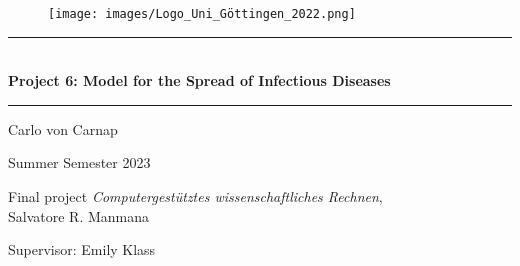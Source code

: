\begin{titlepage}
    \centering
    \vspace*{1.5cm}
    \begin{figure}[H]
        \texttt{[image: images/Logo\_Uni\_Göttingen\_2022.png]}
    \end{figure}
    \vspace*{2.2cm}
    
    \rule{\textwidth}{1pt}\\[0.5cm]
    {\huge \bfseries
      Project 6: Model for the Spread of Infectious Diseases}\\
    \rule{\textwidth}{1pt}
    
    \vspace*{2.7cm}
    
    {\large Carlo von Carnap\\
    
    \vspace*{0.7cm}

    Summer Semester 2023}
    
    \vspace*{4.7cm}

    {\large Final project \textit{Computergestütztes wissenschaftliches Rechnen}, \\
    Salvatore R. Manmana

    \vspace*{0.7cm}
    
    Supervisor: Emily Klass}

    \end{titlepage}